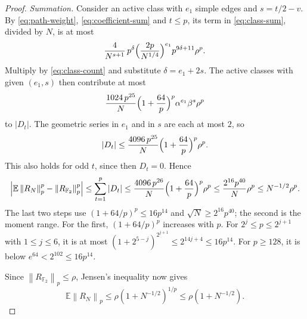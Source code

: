 \documentclass[11pt]{article}
\numberwithin{equation}{section}
\theoremstyle{boldremark}\newtheorem{remark}[theorem]{Remark}
\newcommand{\F}{\mathbb F}
\newcommand{\E}{\mathbb E}
\newcommand{\norm}[1]{\left\lVert #1\right\rVert}
\begin{document}
\begin{proof}
\emph{Summation.}
Consider an active class with $e_1$ simple edges and $s=t/2-v$. By
\eqref{eq:path-weight}, \eqref{eq:coefficient-sum} and $t\le p$, its
term in \eqref{eq:class-sum}, divided by $N$, is at most
\[
 \frac{4}{N^{s+1}}\,p^{\delta}
 \Bigl(\frac{2p}{N^{1/4}}\Bigr)^{e_1}p^{9\delta+11}\rho^p .
\]
Multiply by \eqref{eq:class-count} and substitute $\delta=e_1+2s$.
The active classes with given $(e_1,s)$ then contribute at most
\[
 \frac{1024\,p^{25}}{N}\Bigl(1+\frac{64}{p}\Bigr)^p
 \alpha^{e_1}\beta^{s}\rho^p
\]
to $|D_t|$. The geometric series in $e_1$ and in $s$ are each at most
$2$, so
\[
 |D_t|\le\frac{4096\,p^{25}}{N}\Bigl(1+\frac{64}{p}\Bigr)^p\rho^p .
\]
This also holds for odd $t$, since then $D_t=0$. Hence
\[
 \left|\E\norm{R_N}_p^p-\norm{R_{\F_2}}_p^p\right|
 \le\sum_{t=1}^p|D_t|
 \le\frac{4096\,p^{26}}{N}\Bigl(1+\frac{64}{p}\Bigr)^p\rho^p
 \le\frac{2^{16}p^{40}}{N}\rho^p
 \le N^{-1/2}\rho^p .
\]
The last two steps use $(1+64/p)^p\le16p^{14}$ and
$\sqrt N\ge2^{16}p^{40}$; the second is the moment range. For the first, $(1+64/p)^p$ increases
with $p$. For $2^j\le p\le2^{j+1}$ with $1\le j\le6$, it is at most
$(1+2^{5-j})^{2^{j+1}}\le2^{14j+4}\le16p^{14}$. For $p\ge128$, it is
below $e^{64}<2^{102}\le16p^{14}$.

Since $\norm{R_{\F_2}}_p\le\rho$, Jensen's inequality now gives
\[
 \E\norm{R_N}_p
 \le\rho(1+N^{-1/2})^{1/p}
 \le\rho(1+N^{-1/2}).
\]


\end{proof}
\end{document}
